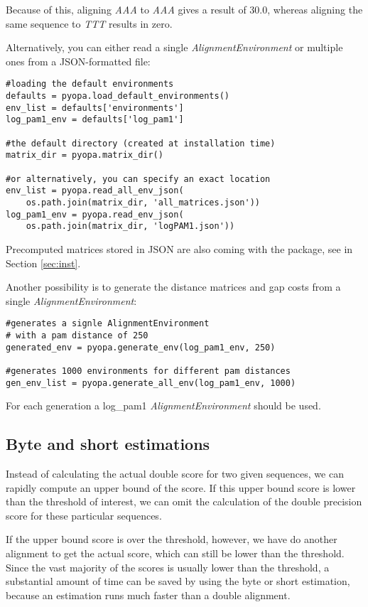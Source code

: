 \documentclass[12pt]{article}
\newcommand{\alenv}{\emph{AlignmentEnvironment}}
\begin{document}
Because of this, aligning \emph{AAA} to \emph{AAA} gives a result of 30.0, whereas aligning the same sequence to \emph{TTT} results in zero.


Alternatively, you can either read a single \alenv{} or multiple ones from a JSON-formatted file:
\begin{lstlisting}
#loading the default environments
defaults = pyopa.load_default_environments()
env_list = defaults['environments']
log_pam1_env = defaults['log_pam1']

#the default directory (created at installation time)
matrix_dir = pyopa.matrix_dir()

#or alternatively, you can specify an exact location
env_list = pyopa.read_all_env_json(
    os.path.join(matrix_dir, 'all_matrices.json'))
log_pam1_env = pyopa.read_env_json(
    os.path.join(matrix_dir, 'logPAM1.json'))
\end{lstlisting}

Precomputed matrices stored in JSON are also coming with the package, see in Section \ref{sec:inst}.

Another possibility is to generate the distance matrices and gap costs from a single \alenv{}:

\begin{lstlisting}
#generates a signle AlignmentEnvironment
# with a pam distance of 250
generated_env = pyopa.generate_env(log_pam1_env, 250)

#generates 1000 environments for different pam distances
gen_env_list = pyopa.generate_all_env(log_pam1_env, 1000)
\end{lstlisting}

For each generation a log\_pam1 \alenv{} should be used.

\subsection{Byte and short estimations}
\label{subsec:bsEstim}
Instead of calculating the actual double score for two given sequences, we can rapidly compute an upper bound of the score. If this upper bound score is lower than the threshold of interest, we can omit the calculation of the double precision score for these particular sequences.

If the upper bound score is over the threshold, however, we have do another alignment to get the actual
 score, which can still be lower than the threshold. Since the vast majority of the scores is usually lower than the threshold, a substantial amount of time can be saved by using the byte or short estimation, because an estimation runs much faster than a double alignment.
\end{document}
